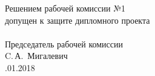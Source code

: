 \newpage
\begin{titlepage}
    \null
    \vfill
    \begin{flushleft}
      \begin{minipage}{0.5\textwidth}
        Решением рабочей комиссии №1\\
        допущен к защите дипломного проекта\\
        \\
        Председатель рабочей комиссии\\
        \underline{\hspace*{2.8cm}} C.\,А.~Мигалевич \\
        \underline{\hspace*{1.2cm}}.01.2018
      \end{minipage}\\[2.2em]
    \end{flushleft}
\end{titlepage}


\pagestyle{empty}
\newpage


\newpage
\pagestyle{fancy}